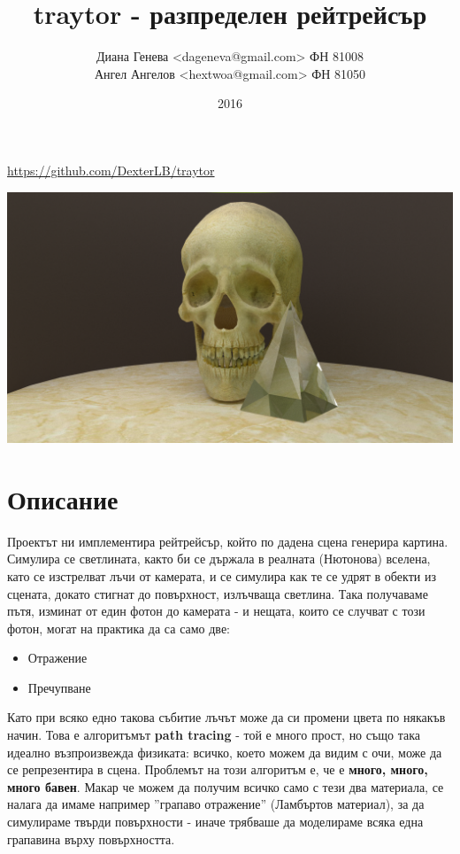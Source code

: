 \documentclass[12pt]{extarticle}
\title{t\textbf{ray}tor - разпределен рейтрейсър}
\author{Диана Генева <dageneva@gmail.com> ФН 81008\\
Ангел Ангелов <hextwoa@gmail.com> ФН 81050}
\date{2016}
\begin{document}
\maketitle
\thispagestyle{empty}

\centerline{\url{https://github.com/DexterLB/traytor}}

\vspace{3cm}
\centerline{\includegraphics[width=\textwidth]{skull.png}}
\pagebreak

\section{Описание}

Проектът ни имплементира рейтрейсър, който по дадена сцена генерира
картина. Симулира се светлината, както би се държала в реалната
(Нютонова) вселена, като се изстрелват лъчи от камерата, и се симулира
как те се удрят в обекти из сцената, докато стигнат до повърхност,
излъчваща светлина. Така получаваме пътя, изминат от един фотон до
камерата - и нещата, които се случват с този фотон, могат на практика да са само две:
\begin{itemize}
	\item Отражение
	\item Пречупване
\end{itemize}
Като при всяко едно такова събитие лъчът може да си промени цвета по
някакъв начин. Това е алгоритъмът \textbf{path tracing} - той е много
прост, но също така идеално възпроизвежда физиката:  всичко, което
можем да видим с очи, може да се репрезентира в сцена. Проблемът на
този алгоритъм е, че е \textbf{много, много, много бавен}. Макар че
можем да получим всичко само с тези два материала, се налага да имаме
например ''грапаво отражение'' (Ламбъртов материал), за да симулираме
твърди повърхности - иначе трябваше да моделираме всяка една грапавина
върху повърхността.
\end{document}
